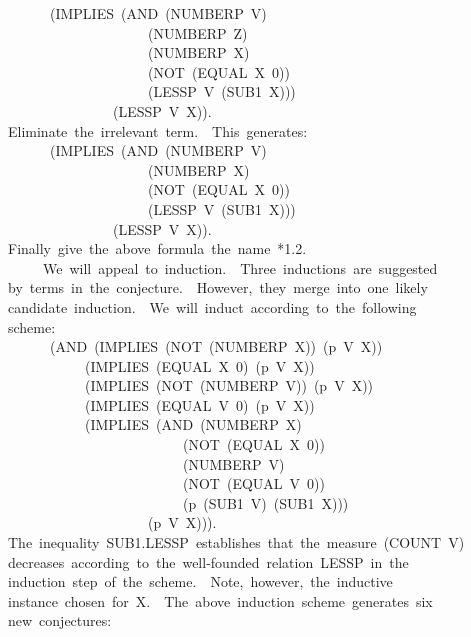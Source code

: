 \documentclass[11pt]{book}
\newenvironment{pubasis}{\begin{flushleft}\ttfamily\small}{\normalsize\rmfamily\end{flushleft}}
\begin{document}
\begin{pubasis}
~~~~~~~~(IMPLIES~(AND~(NUMBERP~V)\\
~~~~~~~~~~~~~~~~~~~~~~(NUMBERP~Z)\\
~~~~~~~~~~~~~~~~~~~~~~(NUMBERP~X)\\
~~~~~~~~~~~~~~~~~~~~~~(NOT~(EQUAL~X~0))\\
~~~~~~~~~~~~~~~~~~~~~~(LESSP~V~(SUB1~X)))\\
~~~~~~~~~~~~~~~~~(LESSP~V~X)).\\

~~Eliminate~the~irrelevant~term.~~This~generates:\\

~~~~~~~~(IMPLIES~(AND~(NUMBERP~V)\\
~~~~~~~~~~~~~~~~~~~~~~(NUMBERP~X)\\
~~~~~~~~~~~~~~~~~~~~~~(NOT~(EQUAL~X~0))\\
~~~~~~~~~~~~~~~~~~~~~~(LESSP~V~(SUB1~X)))\\
~~~~~~~~~~~~~~~~~(LESSP~V~X)).\\

~~Finally~give~the~above~formula~the~name~*1.2.\\

~~~~~~~We~will~appeal~to~induction.~~Three~inductions~are~suggested\\
~~by~terms~in~the~conjecture.~~However,~they~merge~into~one~likely\\
~~candidate~induction.~~We~will~induct~according~to~the~following\\
~~scheme:\\
~~~~~~~~(AND~(IMPLIES~(NOT~(NUMBERP~X))~(p~V~X))\\
~~~~~~~~~~~~~(IMPLIES~(EQUAL~X~0)~(p~V~X))\\
~~~~~~~~~~~~~(IMPLIES~(NOT~(NUMBERP~V))~(p~V~X))\\
~~~~~~~~~~~~~(IMPLIES~(EQUAL~V~0)~(p~V~X))\\
~~~~~~~~~~~~~(IMPLIES~(AND~(NUMBERP~X)\\
~~~~~~~~~~~~~~~~~~~~~~~~~~~(NOT~(EQUAL~X~0))\\
~~~~~~~~~~~~~~~~~~~~~~~~~~~(NUMBERP~V)\\
~~~~~~~~~~~~~~~~~~~~~~~~~~~(NOT~(EQUAL~V~0))\\
~~~~~~~~~~~~~~~~~~~~~~~~~~~(p~(SUB1~V)~(SUB1~X)))\\
~~~~~~~~~~~~~~~~~~~~~~(p~V~X))).\\
~~The~inequality~SUB1.LESSP~establishes~that~the~measure~(COUNT~V)\\
~~decreases~according~to~the~well-founded~relation~LESSP~in~the\\
~~induction~step~of~the~scheme.~~Note,~however,~the~inductive\\
~~instance~chosen~for~X.~~The~above~induction~scheme~generates~six\\
~~new~conjectures:\\


\end{pubasis}
\end{document}
